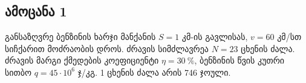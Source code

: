 \documentclass{article}
\begin{document}
\subsection{ამოცანა 1}
განსაზღვრე ბენზინის ხარჯი მანქანის $S = 1$ კმ-ის გავლისას, $v = 60$ კმ/სთ სიჩქარით მოძრაობის დროს. ძრავის სიმძლავრეა $N = 23$ ცხენის ძალა. ძრავის მარგი ქმედების კოეფიციენტი $\eta = 30 ~ \%$, ბენზინის წვის კუთრი სითბო $q = 45 \cdot 10^6$ ჯ/კგ. 1 ცხენის ძალა არის 746 ჯოული.
\end{document}
